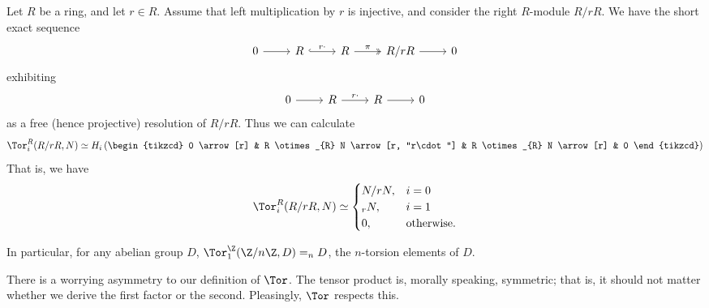 \documentclass[main.tex]{subfiles}
\begin{document}
\begin{example}
  Let $R$ be a ring, and let $r \in R$. Assume that left multiplication by $r$ is injective, and consider the right $R$-module $R/rR$. We have the short exact sequence
  \begin{equation*}
    \begin{tikzcd}
      0
      \arrow[r]
      & R
      \arrow[r, hookrightarrow, "r\cdot"]
      & R
      \arrow[r, twoheadrightarrow, "\pi"]
      & R/rR
      \arrow[r]
      & 0
    \end{tikzcd}
  \end{equation*}
  exhibiting
  \begin{equation*}
    \begin{tikzcd}
      0
      \arrow[r]
      & R
      \arrow[r, "r\cdot"]
      & R
      \arrow[r]
      & 0
    \end{tikzcd}
  \end{equation*}
  as a free (hence projective) resolution of $R/rR$. Thus we can calculate
  \begin{equation*}
    \Tor^{R}_{i}(R/rR, N) \simeq H_{i}
    \left(
    \begin{tikzcd}
      0
      \arrow[r]
      & R \otimes_{R} N
      \arrow[r, "r\cdot"]
      & R \otimes_{R} N
      \arrow[r]
      & 0
    \end{tikzcd}
    \right)
  \end{equation*}
  That is, we have
  \begin{equation*}
    \Tor^{R}_{i}(R/rR, N) \simeq
    \begin{cases}
      N/rN, & i = 0 \\
      _{r}N, & i = 1 \\
      0, &\text{otherwise}.
    \end{cases}
  \end{equation*}

  In particular, for any abelian group $D$, $\Tor^{\Z}_{1}(\Z/n\Z, D) = _{n}D$, the $n$-torsion elements of $D$.
\end{example}

There is a worrying asymmetry to our definition of $\Tor$. The tensor product is, morally speaking, symmetric; that is, it should not matter whether we derive the first factor or the second. Pleasingly, $\Tor$ respects this.
\end{document}
